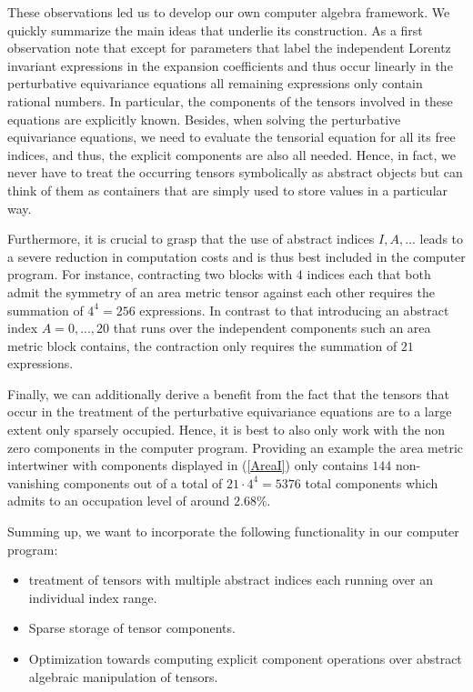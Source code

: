 These observations led us to develop our own computer algebra framework. We quickly summarize the main ideas that underlie its construction.
As a first observation note that except for parameters that label the independent Lorentz invariant expressions in the expansion coefficients and thus occur linearly in the perturbative equivariance equations all remaining expressions only contain rational numbers. In particular, the components of the tensors involved in these equations are explicitly known. Besides, when solving the perturbative equivariance equations, we need to evaluate the tensorial equation for all its free indices, and thus, the explicit components are also all needed. Hence, in fact, we never have to treat the occurring tensors symbolically as abstract objects but can think of them as containers that are simply used to store values in a particular way. 

Furthermore, it is crucial to grasp that the use of abstract indices $I, A, ...$ leads to a severe reduction in computation costs and is thus best included in the computer program. For instance, contracting two blocks with $4$ indices each that both admit the symmetry of an area metric tensor against each other requires the summation of $4^4 = 256$ expressions. In contrast to that introducing an abstract index $A = 0,...,20$ that runs over the independent components such an area metric block contains, the contraction only requires the summation of $21$ expressions.

Finally, we can additionally derive a benefit from the fact that the tensors that occur in the treatment of the perturbative equivariance equations are to a large extent only sparsely occupied. Hence, it is best to also only work with the non zero components in the computer program. Providing an example the area metric intertwiner with components displayed in (\ref{AreaI}) only contains $144$ non-vanishing components out of a total of $21 \cdot 4^4 = 5376$ total components which admits to an occupation level of around $2.68 \%$.

Summing up, we want to incorporate the following functionality in our computer program:
\begin{itemize}
    \item treatment of tensors with multiple abstract indices each running over an individual index range. 
    \item Sparse storage of tensor components.
    \item Optimization towards computing explicit component operations over abstract algebraic manipulation of tensors.
\end{itemize}


